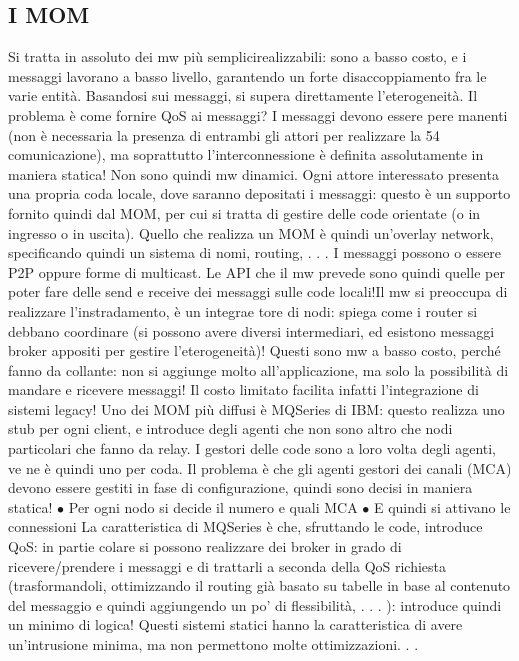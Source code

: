 \subsection{I MOM}
Si tratta in assoluto dei mw più semplicirealizzabili: sono a basso costo, e i
messaggi lavorano a basso livello, garantendo un forte disaccoppiamento fra le
varie entità. Basandosi sui messaggi, si supera direttamente l'eterogeneità.
Il problema è come fornire QoS ai messaggi? I messaggi devono essere pere
manenti (non è necessaria la presenza di entrambi gli attori per realizzare la
54
comunicazione), ma soprattutto l'interconnessione è definita assolutamente in
maniera statica! Non sono quindi mw dinamici.
Ogni attore interessato presenta una propria coda locale, dove saranno depositati i messaggi: questo è un supporto
fornito quindi dal MOM, per cui si
tratta di gestire delle code orientate (o in ingresso o in uscita). Quello che realizza un MOM è quindi un'overlay
network, specificando quindi un sistema di
nomi, routing, . . .
I messaggi possono o essere P2P oppure forme di multicast. Le API che il
mw prevede sono quindi quelle per poter fare delle send e receive dei messaggi
sulle code locali!Il mw si preoccupa di realizzare l'instradamento, è un integrae
tore di nodi: spiega come i router si debbano coordinare (si possono avere diversi
intermediari, ed esistono messaggi broker appositi per gestire l'eterogeneità)!
Questi sono mw a basso costo, perché fanno da collante: non si aggiunge
molto all'applicazione, ma solo la possibilità di mandare e ricevere messaggi! Il
costo limitato facilita infatti l'integrazione di sistemi legacy!
Uno dei MOM più diffusi è MQSeries di IBM: questo realizza uno stub per
ogni client, e introduce degli agenti che non sono altro che nodi particolari che
fanno da relay. I gestori delle code sono a loro volta degli agenti, ve ne è quindi
uno per coda. Il problema è che gli agenti gestori dei canali (MCA) devono
essere gestiti in fase di configurazione, quindi sono decisi in maniera statica!
$\bullet$ Per ogni nodo si decide il numero e quali MCA
$\bullet$ E quindi si attivano le connessioni
La caratteristica di MQSeries è che, sfruttando le code, introduce QoS: in partie
colare si possono realizzare dei broker in grado di ricevere/prendere i messaggi e
di trattarli a seconda della QoS richiesta (trasformandoli, ottimizzando il routing già basato su tabelle in base al
contenuto del messaggio e quindi aggiungendo
un po' di flessibilità, . . . ): introduce quindi un minimo di logica!
Questi sistemi statici hanno la caratteristica di avere un'intrusione minima,
ma non permettono molte ottimizzazioni. . .
